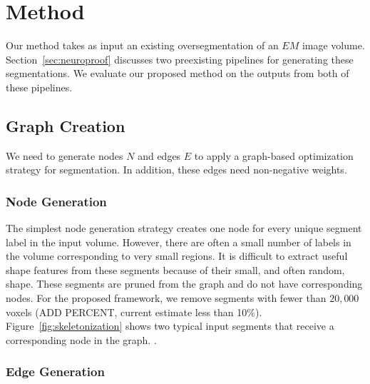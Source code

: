 \section{Method}

Our method takes as input an existing oversegmentation of an $EM$ image volume. 
Section~\ref{sec:neuroproof} discusses two preexisting pipelines for generating these segmentations.
We evaluate our proposed method on the outputs from both of these pipelines.

\subsection{Graph Creation}

We need to generate nodes $N$ and edges $E$ to apply a graph-based optimization strategy for segmentation. 
In addition, these edges need non-negative weights.

\subsubsection{Node Generation}

The simplest node generation strategy creates one node for every unique segment label in the input volume.
However, there are often a small number of labels in the volume corresponding to very small regions.
It is difficult to extract useful shape features from these segments because of their small, and often random, shape. 
These segments are pruned from the graph and do not have corresponding nodes. 
For the proposed framework, we remove segments with fewer than $20,000$ voxels (ADD PERCENT, current estimate less than 10\%).
Figure~\ref{fig:skeletonization} shows two typical input segments that receive a corresponding node in the graph. . 

\subsubsection{Edge Generation}

